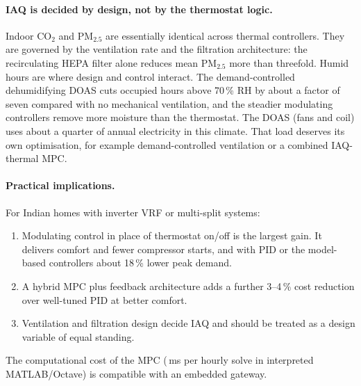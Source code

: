 \paragraph{IAQ is decided by design, not by the thermostat logic.}
Indoor CO$_2$ and PM$_{2.5}$ are essentially identical across thermal controllers. They
are governed by the ventilation rate and the filtration architecture: the recirculating
HEPA filter alone reduces mean PM$_{2.5}$ more than threefold. Humid hours are where
design and control interact. The demand-controlled dehumidifying DOAS cuts occupied
hours above 70\,\% RH by about a factor of seven compared with no mechanical
ventilation, and the steadier modulating controllers remove more moisture than the
thermostat. The DOAS (fans and coil) uses about a quarter of annual electricity in this
climate. That load deserves its own optimisation, for example demand-controlled
ventilation or a combined IAQ-thermal MPC.

\paragraph{Practical implications.}
For Indian homes with inverter VRF or multi-split systems:
\begin{enumerate}
  \item Modulating control in place of thermostat on/off is the largest gain. It
        delivers comfort and fewer compressor starts, and with PID or the model-based
        controllers about 18\,\% lower peak demand.
  \item A hybrid MPC plus feedback architecture adds a further 3--4\,\% cost reduction
        over well-tuned PID at better comfort.
  \item Ventilation and filtration design decide IAQ and should be treated as a design
        variable of equal standing.
\end{enumerate}
The computational cost of the MPC (\MsMpc\,ms per hourly solve in interpreted
MATLAB/Octave) is compatible with an embedded gateway.
